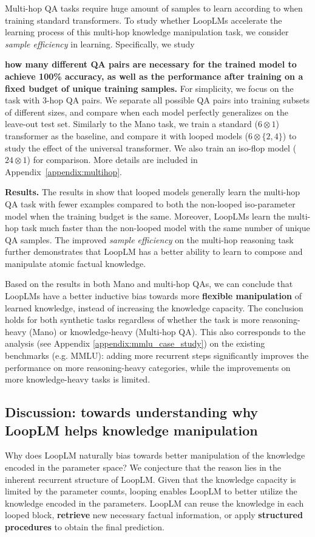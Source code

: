 \documentclass[]{bytedance_seed}
\newcommand{\1}{\mathbf{1}}
\newcommand{\ut}{LoopLM}
\begin{document}
Multi-hop QA tasks require huge amount of samples to learn according to \cite{yao2025language} when training standard transformers. To study whether \ut{}s accelerate the learning process of this multi-hop knowledge manipulation task, 
we consider \textit{sample efficiency} in learning. Specifically, we study {\textbf{how many different QA pairs are necessary for the trained model to achieve 100\% accuracy, as well as the performance after training on a fixed budget of unique training samples.} For simplicity, we focus on the task with 3-hop QA pairs. We separate all possible QA pairs into training subsets of different sizes, and compare when each model perfectly generalizes on the leave-out test set.
Similarly to the Mano task, we train a standard ($6\otimes1$) transformer as the baseline, and compare it with looped models ($6\otimes \{2,4\}$) to study the effect of the universal transformer. We also train an iso-flop model ($24\otimes 1$) for comparison.  More details are included in Appendix~\ref{appendix:multihop}.

\textbf{Results.} The results in  show that looped models generally learn the multi-hop QA task with fewer examples compared to both the non-looped iso-parameter model when the training budget is the same. Moreover, \ut{}s learn the multi-hop task much faster than the non-looped model with the same number of unique QA samples. The improved \textit{sample efficiency} on the multi-hop reasoning task further demonstrates that \ut{} has a better ability to learn to compose and manipulate atomic factual knowledge. 

Based on the results in both Mano and multi-hop QAs, we can conclude that \ut{}s have a better inductive bias towards more \textbf{flexible manipulation} of learned knowledge, instead of increasing the knowledge capacity. The conclusion holds for both synthetic tasks regardless of whether the task is more reasoning-heavy (Mano) or knowledge-heavy (Multi-hop QA). This also corresponds to the analysis (see Appendix \ref{appendix:mmlu_case_study}) on the existing benchmarks (e.g. MMLU): adding more recurrent steps significantly improves the performance on more reasoning-heavy categories, while the improvements on more knowledge-heavy tasks is limited.

\subsection{Discussion: towards understanding why \ut{} helps knowledge manipulation}
\label{subsec:theory_and_discussion}
Why does \ut{} naturally bias towards better manipulation of the knowledge encoded in the parameter space? We conjecture that the reason lies in the inherent recurrent structure of \ut{}. Given that the knowledge capacity is limited by the parameter counts, looping enables \ut{} to better utilize the knowledge encoded in the parameters.
\ut{} can reuse the knowledge in each looped block, \textbf{retrieve} new necessary factual information, or apply \textbf{structured procedures} to obtain the final prediction.

}
\end{document}
